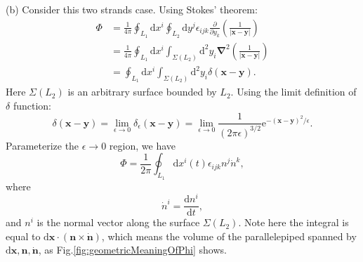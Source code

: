 \documentclass{book}
\begin{document}
(b) Consider this two strands case. Using Stokes' theorem:
\begin{equation*}
\begin{aligned}
\Phi  & =\frac{1}{4\pi }\oint _{L_{1}}\mathrm{d} x^{i}\oint _{L_{2}}\mathrm{d} y^{j} \epsilon _{ijk}\frac{\partial }{\partial y_{k}}\left(\frac{1}{| \boldsymbol{x} -\boldsymbol{y}| }\right)\\
 & =\frac{1}{4\pi }\oint _{L_{1}}\mathrm{d} x^{i}\int _{\Sigma ( L_{2})}\mathrm{d}^{2} y_{i}\boldsymbol{\nabla }^{2}\left(\frac{1}{| \boldsymbol{x} -\boldsymbol{y}| }\right)\\
 & =\oint _{L_{1}}\mathrm{d} x^{i}\int _{\Sigma ( L_{2})}\mathrm{d}^{2} y_{i} \delta (\boldsymbol{x} -\boldsymbol{y}) .
\end{aligned}
\end{equation*}
Here $\Sigma ( L_{2})$ is an arbitrary surface bounded by $L_{2}$. Using the limit definition of $\delta $ function:
\begin{equation*}
\delta (\boldsymbol{x} -\boldsymbol{y}) =\lim _{\epsilon \rightarrow 0} \delta _{\epsilon }(\boldsymbol{x} -\boldsymbol{y}) =\lim _{\epsilon \rightarrow 0}\frac{1}{( 2\pi \epsilon )^{3/2}}\mathrm{e}^{-(\boldsymbol{x} -\boldsymbol{y})^{2} /\epsilon } .
\end{equation*}
Parameterize the $\epsilon \rightarrow 0$ region, we have 
\begin{equation*}
\Phi =\frac{1}{2\pi }\oint _{L_{1}}\mathrm{d} x^{i}( t) \epsilon _{ijk} n^{j}\dot{n}^{k} ,
\end{equation*}
where
\begin{equation*}
\dot{n}^{i} =\frac{\mathrm{d} n^{i}}{\mathrm{d} t} ,
\end{equation*}
and $n^{i}$ is the normal vector along the surface $\Sigma ( L_{2})$. Note here the integral is equal to $\mathrm{d}\boldsymbol{x} \cdot (\boldsymbol{n} \times \dot{\boldsymbol{n}} )$, which means the volume of the parallelepiped spanned by $\mathrm{d}\boldsymbol{x} ,\boldsymbol{n} ,\dot{\boldsymbol{n}}$, as Fig.\ref{fig:geometricMeaningOfPhi} shows.
\end{document}
